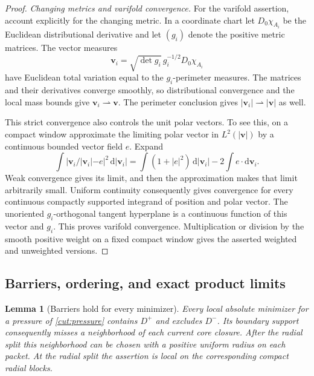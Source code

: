 \documentclass[11pt]{article}
\numberwithin{equation}{section}
\newtheorem{lemma}[theorem]{Lemma}
\theoremstyle{definition}
\theoremstyle{remark}
\begin{document}
\begin{proof}
\emph{Changing metrics and varifold convergence.}
For the varifold assertion, account explicitly for the changing metric.
In a coordinate chart let $D_0\chi_{A_i}$ be the
Euclidean distributional derivative and let $(g_i)$ denote the positive
metric matrices.  The vector measures
\[
      \mathbf v_i=\sqrt{\det g_i}\,g_i^{-1/2}D_0\chi_{A_i}
\]
have Euclidean total variation equal to the $g_i$-perimeter measures.
The matrices and their derivatives converge smoothly, so distributional
convergence and the local mass bounds give $\mathbf v_i\rightharpoonup
\mathbf v$.  The perimeter conclusion gives
$|\mathbf v_i|\rightharpoonup|\mathbf v|$ as well.

This strict convergence also controls the unit polar vectors.  To see
this, on a compact window approximate the limiting polar vector in
$L^2(|\mathbf v|)$ by a continuous bounded vector field $e$.
Expand
\[
 \int|\mathbf v_i/|\mathbf v_i|-e|^2\,\mathrm d|\mathbf v_i|
 =\int(1+|e|^2)\,\mathrm d|\mathbf v_i|-2\int e\cdot\mathrm d\mathbf v_i.
\]
Weak convergence gives its limit, and then the approximation makes that
limit arbitrarily small.  Uniform continuity consequently gives
convergence for every continuous compactly supported integrand of
position and polar vector.  The unoriented $g_i$-orthogonal tangent
hyperplane is a continuous function of this vector and $g_i$.
This proves varifold convergence.  Multiplication or division by the
smooth positive weight on a fixed compact window gives the asserted
weighted and unweighted versions.
\end{proof}

\subsection{Barriers, ordering, and exact product limits}

\begin{lemma}[Barriers hold for every minimizer]\label{cut:barriers}
Every local absolute minimizer for a pressure of
\cref{cut:pressure} contains $D^+$ and excludes $D^-$.  Its boundary
support consequently misses a neighborhood of each current core closure.
After the radial split this neighborhood can be chosen with a positive
uniform radius on each packet.  At the radial split the assertion is
local on the corresponding compact radial blocks.
\end{lemma}
\end{document}

